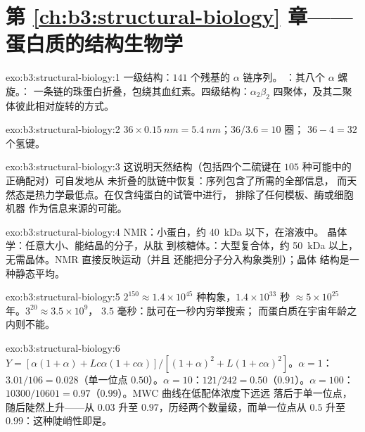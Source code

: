 \section*{第 \ref{ch:b3:structural-biology} 章——蛋白质的结构生物学}

\begin{solution}{exo:b3:structural-biology:1}
一级结构：$141$ 个残基的 $\alpha$ 链序列。
：其八个 $\alpha$ 螺旋。：
一条链的珠蛋白折叠，包绕其血红素。四级结构：$\alpha_{2}\beta_{2}$
四聚体，及其二聚体彼此相对旋转的方式。
\end{solution}

\begin{solution}{exo:b3:structural-biology:2}
$36\times \qty{0.15}{nm} = \qty{5.4}{nm}$；$36/3.6 = 10$ 圈；
$36 - 4 = 32$ 个氢键。
\end{solution}

\begin{solution}{exo:b3:structural-biology:3}
这说明天然结构（包括四个二硫键在
$105$ 种可能中的正确配对）可自发地从
未折叠的肽链中恢复：序列包含了所需的全部信息，
而天然态是热力学最低点。在仅含纯蛋白的试管中进行，
排除了任何模板、酶或细胞机器
作为信息来源的可能。
\end{solution}

\begin{solution}{exo:b3:structural-biology:4}
NMR：小蛋白，约 \qty{40}{kDa} 以下，在溶液中。
晶体学：任意大小、能结晶的分子，从肽
到核糖体。：大型复合体，约
\qty{50}{kDa} 以上，无需晶体。NMR 直接反映运动（并且
还能把分子分入构象类别）；晶体
结构是一种静态平均。
\end{solution}

\begin{solution}{exo:b3:structural-biology:5}
$2^{150} \approx 1.4\times 10^{45}$ 种构象，$1.4\times 10^{33}$
秒 $\approx 5\times 10^{25}$ 年。$3^{20} \approx 3.5\times 10^{9}$，
$3.5$ 毫秒：肽可在一秒内穷举搜索；
而蛋白质在宇宙年龄之内则不能。
\end{solution}

\begin{solution}{exo:b3:structural-biology:6}
$Y = [\alpha(1+\alpha) + Lc\alpha(1+c\alpha)]/[(1+\alpha)^{2} +
L(1+c\alpha)^{2}]$。$\alpha = 1$：$3.01/106 = 0.028$（单一位点
$0.50$）。$\alpha = 10$：$121/242 = 0.50$（$0.91$）。$\alpha = 100$：
$\num{10300}/\num{10601} = 0.97$（$0.99$）。MWC 曲线在低配体浓度下远远
落后于单一位点，随后陡然上升——从 $0.03$
升至 $0.97$，历经两个数量级，而单一位点从 $0.5$ 升至
$0.99$：这种陡峭性即是。
\end{solution}


